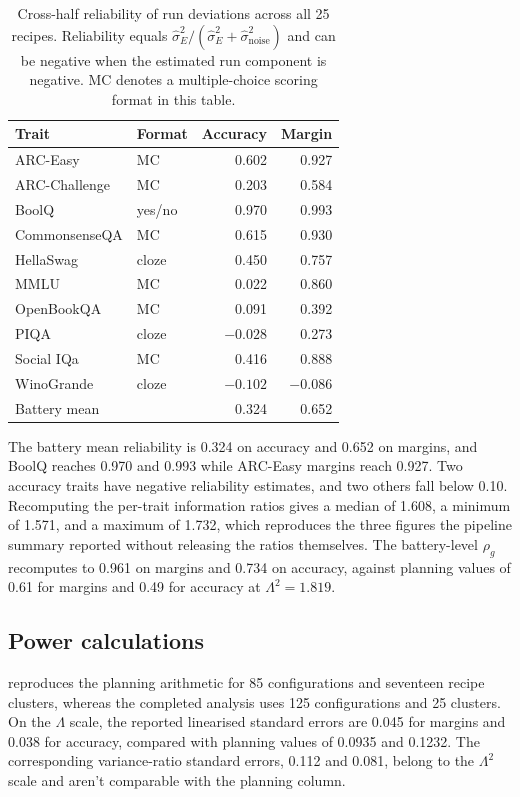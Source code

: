 \begin{table}[!htb]
\centering
\caption{Cross-half reliability of run deviations across all 25 recipes. Reliability equals $\widehat\sigma_E^2/(\widehat\sigma_E^2+\widehat\sigma_{\mathrm{noise}}^2)$ and can be negative when the estimated run component is negative. MC denotes a multiple-choice scoring format in this table.}
\label{tab:original3}
\small\setlength{\tabcolsep}{4pt}\renewcommand{\arraystretch}{1.12}
\begin{tabular}{llrr}\toprule
Trait & Format & Accuracy & Margin\\\midrule
ARC-Easy & MC & 0.602 & 0.927\\
ARC-Challenge & MC & 0.203 & 0.584\\
BoolQ & yes/no & 0.970 & 0.993\\
CommonsenseQA & MC & 0.615 & 0.930\\
HellaSwag & cloze & 0.450 & 0.757\\
MMLU & MC & 0.022 & 0.860\\
OpenBookQA & MC & 0.091 & 0.392\\
PIQA & cloze & $-0.028$ & 0.273\\
Social IQa & MC & 0.416 & 0.888\\
WinoGrande & cloze & $-0.102$ & $-0.086$\\
Battery mean & & 0.324 & 0.652\\\bottomrule
\end{tabular}
\end{table}

The battery mean reliability is 0.324 on accuracy and 0.652 on margins, and BoolQ reaches 0.970 and 0.993 while ARC-Easy margins reach 0.927. Two accuracy traits have negative reliability estimates, and two others fall below 0.10. Recomputing the per-trait information ratios gives a median of 1.608, a minimum of 1.571, and a maximum of 1.732, which reproduces the three figures the pipeline summary reported without releasing the ratios themselves. The battery-level $\rho_g$ recomputes to 0.961 on margins and 0.734 on accuracy, against planning values of 0.61 for margins and 0.49 for accuracy at $\Lambda^2=1.819$.
\subsection{Power calculations}
 reproduces the planning arithmetic for 85 configurations and seventeen recipe clusters, whereas the completed analysis uses 125 configurations and 25 clusters. On the $\Lambda$ scale, the reported linearised standard errors are 0.045 for margins and 0.038 for accuracy, compared with planning values of 0.0935 and 0.1232. The corresponding variance-ratio standard errors, 0.112 and 0.081, belong to the $\Lambda^2$ scale and aren't comparable with the planning column.

